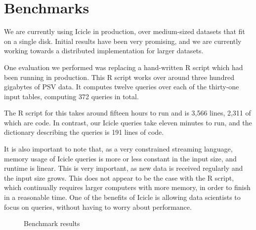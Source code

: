 \section{Benchmarks}
\label{s:Benchmarks}

We are currently using Icicle in production, over medium-sized datasets that fit on a single disk.
Initial results have been very promising, and we are currently working towards a distributed implementation for larger datasets.

One evaluation we performed was replacing a hand-written R script which had been running in production.
This R script works over around three hundred gigabytes of PSV data.
It computes twelve queries over each of the thirty-one input tables, computing 372 queries in total.

The R script for this takes around fifteen hours to run and is 3,566 lines, 2,311 of which are code.
In contrast, our Icicle queries take eleven minutes to run, and the dictionary describing the queries is 191 lines of code.

It is also important to note that, as a very constrained streaming language, memory usage of Icicle queries is more or less constant in the input size, and runtime is linear.
This is very important, as new data is received regularly and the input size grows.
This does not appear to be the case with the R script, which continually requires larger computers with more memory, in order to finish in a reasonable time.
One of the benefits of Icicle is allowing data scientists to focus on queries, without having to worry about performance.

\begin{figure}


\caption{Benchmark results}
\label{fig:bench:table}
\end{figure}

